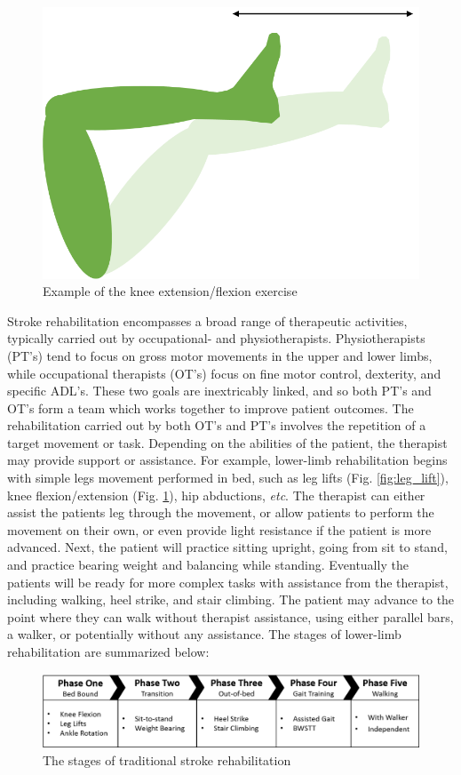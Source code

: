 \documentclass[12pt]{report}
\begin{document}
		\begin{figure}[h] 
		\centering
		\includegraphics[width=0.6\linewidth]{knee_extension}
		\caption{Example of the knee extension/flexion exercise}
		\label{fig:knee_ext}
	\end{figure}

Stroke rehabilitation encompasses a broad range of therapeutic activities, typically carried out by occupational- and physiotherapists. Physiotherapists (PT's) tend to focus on gross motor movements in the upper and lower limbs, while occupational therapists (OT's) focus on fine motor control, dexterity, and specific ADL's. These two goals are inextricably linked, and so both PT's and OT's form a team which works together to improve patient outcomes. The rehabilitation carried out by both OT's and PT's involves the repetition of a target movement or task. Depending on the abilities of the patient, the therapist may provide support or assistance. For example, lower-limb rehabilitation begins with simple legs movement performed in bed, such as leg lifts (Fig. \ref{fig:leg_lift}), knee flexion/extension (Fig. \ref{fig:knee_ext}), hip abductions, \textit{etc}. The therapist can either assist the patients leg through the movement, or allow patients to perform the movement on their own, or even provide light resistance if the patient is more advanced. Next, the patient will practice sitting upright, going from sit to stand, and  practice bearing weight and balancing while standing. Eventually the patients will be ready for more complex tasks with assistance from the therapist, including walking, heel strike, and stair climbing. The patient may advance to the point where they can walk without therapist assistance, using either parallel bars, a walker, or potentially without any assistance. The stages of lower-limb rehabilitation are summarized below:


	\begin{figure}[h] 
		\centering
		\includegraphics[width=\linewidth]{Traditional_therapy}
		\caption{The stages of traditional stroke rehabilitation}
		\label{fig:stages}
	\end{figure}
\end{document}
